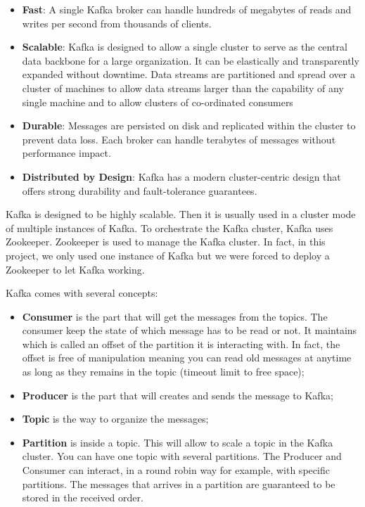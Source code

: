 \begin{itemize}
\item\textbf{Fast}: A single Kafka broker can handle hundreds of megabytes of reads and writes per second from thousands of clients.
\item\textbf{Scalable}: Kafka is designed to allow a single cluster to serve as the central data backbone for a large organization. It can be elastically and transparently expanded without downtime. Data streams are partitioned and spread over a cluster of machines to allow data streams larger than the capability of any single machine and to allow clusters of co-ordinated consumers
\item\textbf{Durable}: Messages are persisted on disk and replicated within the cluster to prevent data loss. Each broker can handle terabytes of messages without performance impact.
\item\textbf{Distributed by Design}: Kafka has a modern cluster-centric design that offers strong durability and fault-tolerance guarantees. 
\end{itemize}

Kafka is designed to be highly scalable. Then it is usually used in a cluster mode of multiple instances of Kafka. To orchestrate the Kafka cluster, Kafka uses Zookeeper. Zookeeper is used to manage the Kafka cluster. In fact, in this project, we only used one instance of Kafka but we were forced to deploy a Zookeeper to let Kafka working.

Kafka comes with several concepts:

\begin{itemize}
\item\textbf{Consumer} is the part that will get the messages from the topics. The consumer keep the state of which message has to be read or not. It maintains which is called an offset of the partition it is interacting with. In fact, the offset is free of manipulation meaning you can read old messages at anytime as long as they remains in the topic (timeout limit to free space);
\item\textbf{Producer} is the part that will creates and sends the message to Kafka;
\item\textbf{Topic} is the way to organize the messages;
\item\textbf{Partition} is inside a topic. This will allow to scale a topic in the Kafka cluster. You can have one topic with several partitions. The Producer and Consumer can interact, in a round robin way for example, with specific partitions. The messages that arrives in a partition are guaranteed to be stored in the received order.
\end{itemize}

